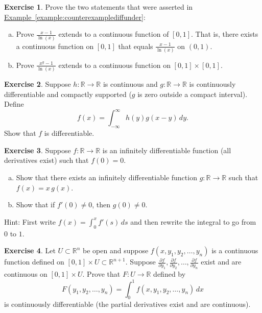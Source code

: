 \documentclass[12pt,openany]{book}
\newcommand{\R}{{\mathbb{R}}}
\theoremstyle{plain}
\theoremstyle{remark}
\theoremstyle{definition}
\newenvironment{exbox}{%
    \def\FrameCommand{\vrule width 1pt \relax\hspace{10pt}}%
    \MakeFramed{\advance\hsize-\width\FrameRestore}%
}{%
    \endMakeFramed
}
\newenvironment{exparts}{%
    \leavevmode\begin{enumerate}[a),noitemsep,topsep=0pt,parsep=0pt,partopsep=0pt]
}{%
    \end{enumerate}
}
\theoremstyle{exercise}
\newtheorem{exercise}{Exercise}[section]
\theoremstyle{example}
\newcommand{\exampleref}[1]{\hyperref[#1]{Example~\ref*{#1}}}
\begin{document}
\begin{exbox}
\begin{exercise} \label{exercise:counterexamplediffunder}
Prove the two statements that were asserted in
\exampleref{example:counterexamplediffunder}:
\begin{exparts}
\item
Prove $\frac{x-1}{\ln(x)}$ extends to a continuous function of
$[0,1]$.  That is, there exists a continuous function on $[0,1]$
that equals $\frac{x-1}{\ln(x)}$ on $(0,1)$.
\item
Prove $\frac{x^y-1}{\ln(x)}$ extends to a continuous function
on $[0,1] \times [0,1]$.
\end{exparts}
\end{exercise}

\begin{exercise}
Suppose $h \colon \R \to \R$ is continuous and $g
\colon \R \to \R$ is continuously differentiable and compactly
supported ($g$ is zero outside a compact interval).  Define
\begin{equation*}
f(x) = \int_{-\infty}^\infty h(y)g(x-y) \, dy  .
\end{equation*}
Show that $f$ is differentiable.
\end{exercise}

\begin{exercise}
Suppose $f \colon \R \to \R$ is an infinitely differentiable function (all derivatives exist)
such that $f(0) = 0$.
\begin{exparts}
\item
Show that there exists an infinitely
differentiable function $g \colon \R \to \R$ such that $f(x) = x\,g(x)$.
\item
Show that
if $f'(0) \not= 0$, then $g(0) \not= 0$.
\end{exparts}
Hint: First write
$f(x) = \int_0^x f'(s) \,ds$ and then rewrite the integral to go
from $0$ to $1$.
\end{exercise}

\begin{exercise}%
\label{exercise:severalvariableLeibniz}
Let $U \subset \R^n$ be open and suppose
$f(x,y_1,y_2,\ldots,y_n)$ is a continuous
function defined on $[0,1] \times U \subset \R^{n+1}$.
Suppose
$\frac{\partial f}{\partial y_1},
\frac{\partial f}{\partial y_2},\ldots,
\frac{\partial f}{\partial y_n}$
exist and are continuous on $[0,1] \times U$.
Prove that $F \colon U \to \R$ defined by
\begin{equation*}
F(y_1,y_2,\ldots,y_n) =
\int_0^1
f(x,y_1,y_2,\ldots,y_n)
\, dx
\end{equation*}
is continuously differentiable (the partial derivatives exist and are
continuous).
\end{exercise}


\end{exbox}
\end{document}
